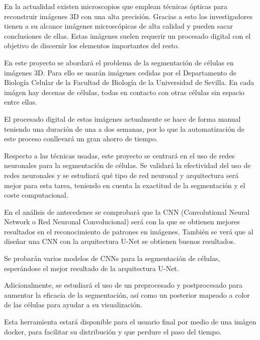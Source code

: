 
En la actualidad existen microscopios que emplean técnicas ópticas para reconstruir imágenes 3D con una alta precisión. Gracias a esto los investigadores tienen a su alcance imágenes microscópicas de alta calidad y pueden sacar conclusiones de ellas. Estas imágenes suelen requerir un procesado digital con el objetivo de discernir los elementos importantes del resto.

En este proyecto se abordará el problema de la segmentación de células en imágenes 3D. Para ello se usarán imágenes  cedidas por el Departamento de Biología Celular de la Facultad de Biología de la Universidad de Sevilla. En cada imágen hay decenas de células, todas en contacto con otras células sin espacio entre ellas.

El procesado digital de estas imágenes actualmente se hace de forma manual teniendo una duración de una a dos semanas, por lo que la automatización de este proceso conllevará un gran ahorro de tiempo.

Respecto a las técnicas usadas, este proyecto se centrará en el uso de redes neuronales para la segmentación de células. Se validará la efectividad del uso de redes neuronales y se estudiará qué tipo de red neuronal y arquitectura será mejor para esta tarea, teniendo en cuenta la exactitud de la segmentación y el coste computacional.

En el análisis de antecedenes se comprobará que la CNN (Convolutional Neural Network o Red Neuronal Convolucional) será con la que se obtienen mejores resultados en el reconocimiento de patrones en imágenes. También se verá que al diseñar una CNN con la arquitectura U-Net se obtienen buenos resultados.

Se probarán varios modelos de CNNs para la segmentación de células, esperándose el mejor resultado de la arquitectura U-Net.

Adicionalmente, se estudiará el uso de un preprocesado y postprocesado para aumentar la eficacia de la segmentación, así como un posterior mapeado a color de las células para ayudar a su visualización.

Esta herramienta estará disponible para el usuario final por medio de una imágen docker, para facilitar su distribución y que perdure el paso del tiempo.
